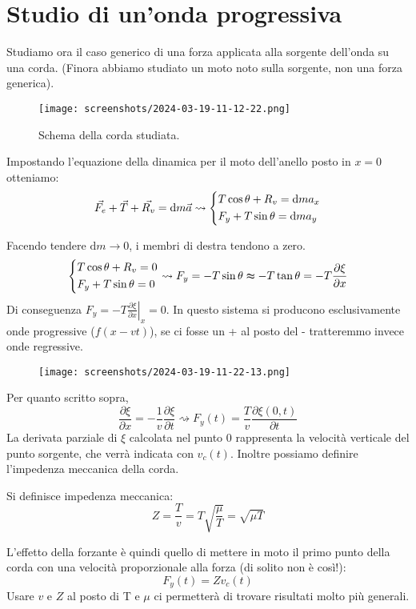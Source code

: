 \section{Studio di un'onda progressiva}

Studiamo ora il caso generico di una forza applicata alla sorgente dell'onda su una corda. (Finora abbiamo studiato un moto noto sulla sorgente, non una forza generica).

\begin{figure}[H]
	\centering
	\texttt{[image: screenshots/2024-03-19-11-12-22.png]}
	\caption{Schema della corda studiata.}
	\label{fig:corda-forzata}
\end{figure}

Impostando l'equazione della dinamica per il moto dell'anello posto in \(x=0\) otteniamo:
\[
	\vec{F_e} + \vec{T} +\vec{R_v}  = \mathrm{d}m \vec{a} \rightsquigarrow \begin{dcases}
		T\cos \theta + R_v = \mathrm{d} m a_x\\
		F_y + T\sin \theta =\mathrm{d} m a_y  \\
	\end{dcases}
\]

Facendo tendere \(\mathrm{d} m \to 0\), i membri di destra tendono a zero.
\[
	\begin{dcases}
		T\cos \theta + R_v = 0\\
		F_y + T\sin \theta = 0  \\
	\end{dcases}
	\rightsquigarrow F_y = -T\sin \theta \thickapprox -T \tan \theta = -T \frac{\partial \xi }{\partial x}
\]
Di conseguenza \(F_y = -T \left. \frac{\partial \xi }{\partial x}\right\vert_x=0 \). In questo sistema si producono esclusivamente onde progressive (\(f(x-vt)\)), se ci fosse un + al posto del - tratteremmo invece onde regressive.
\begin{figure}[H]
	\centering
	\texttt{[image: screenshots/2024-03-19-11-22-13.png]}
\end{figure}
Per quanto scritto sopra,
\[
	\frac{\partial \xi }{\partial x} = - \frac{1}{v} \frac{\partial \xi }{\partial t} \rightsquigarrow F_y(t) = \frac{T}{v}\frac{\partial \xi (0,t)}{\partial t} 
\]
La derivata parziale di \(\xi \) calcolata nel punto 0 rappresenta la velocità verticale del punto sorgente, che verrà indicata con \(v_c(t)\). Inoltre possiamo definire l'impedenza meccanica della corda.
\begin{definition}
	Si definisce impedenza meccanica:
	\[
		Z=\frac{T}{v}= T \sqrt{\frac{\mu }{T}} = \sqrt{\mu T}  
	\]
\end{definition} 
L'effetto della forzante è quindi quello di mettere in moto il primo punto della corda con una velocità proporzionale alla forza (di solito non è così!):
\[
	F_y(t) = Zv_c(t)
\]
Usare \(v\) e \(Z\) al posto di T e \(\mu \) ci permetterà di trovare risultati molto più generali.

